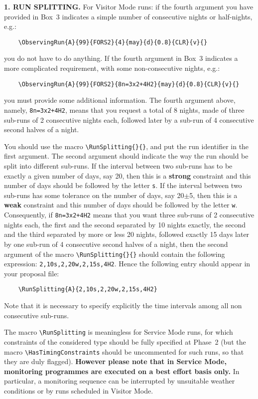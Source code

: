 \documentclass{article}
\begin{document}
{\bf 1. RUN SPLITTING.} For Visitor Mode runs: if the fourth argument
you have provided in 
Box~3 indicates a simple number of consecutive nights or half-nights,
e.g.:
\begin{verbatim}
    \ObservingRun{A}{99}{FORS2}{4}{may}{d}{0.8}{CLR}{v}{}
\end{verbatim}
you do not have to do anything.  If the fourth argument in Box~3
indicates a more complicated requirement, with some non-consecutive
nights, e.g.: 
\begin{verbatim}
    \ObservingRun{A}{99}{FORS2}{8n=3x2+4H2}{may}{d}{0.8}{CLR}{v}{}
\end{verbatim}
you must provide some additional information.  The fourth argument above,
namely, \verb|8n=3x2+4H2|, means that you request a total of 8 nights,
made of three sub-runs of 2 consecutive nights each, followed later by
a sub-run of 4 consecutive second halves of a night.

You should use the macro \verb|\RunSplitting{}{}|, and put
the run identifier in the first argument.  The second argument should indicate
the way the run should be split into different sub-runs.  If the
interval between two sub-runs has to be exactly a given number of
days, say 20, then this is a {\bf strong} constraint and this number
of days should be followed by the letter \verb|s|.  If the interval
between two sub-runs has some tolerance on the number of days, say
20$\pm$5, then this is a {\bf weak} constraint and this number of days
should be followed by the letter \verb|w|.  Consequently, if
\verb|8n=3x2+4H2| means that you want three sub-runs of 2 consecutive
nights each, the first and the second separated by 10 nights exactly,
the second and the third separated by more or less 20 nights, followed
exactly 15 days later by one sub-run of 4 consecutive second halves of
a night, then the second argument of the macro
\verb|\RunSplitting{}{}| should contain the following expression:
\verb|2,10s,2,20w,2,15s,4H2|. Hence the following entry should appear
in your proposal file:
\begin{verbatim}
    \RunSplitting{A}{2,10s,2,20w,2,15s,4H2}
\end{verbatim}

Note that it is necessary to specify explicitly the time intervals
among all non consecutive sub-runs.

The macro \verb|\RunSplitting| is meaningless for Service Mode runs,
for which constraints of the considered type should be fully specified
at Phase~2 (but the macro \verb|\HasTimingConstraints| should be
uncommented for such runs, so that they are duly flagged). {\bf
  However please note that in Service Mode, 
  monitoring programmes are executed on a best effort 
  basis only.} In particular, a monitoring sequence can be interrupted
by unsuitable weather conditions or by runs scheduled in Visitor Mode.
\end{document}
